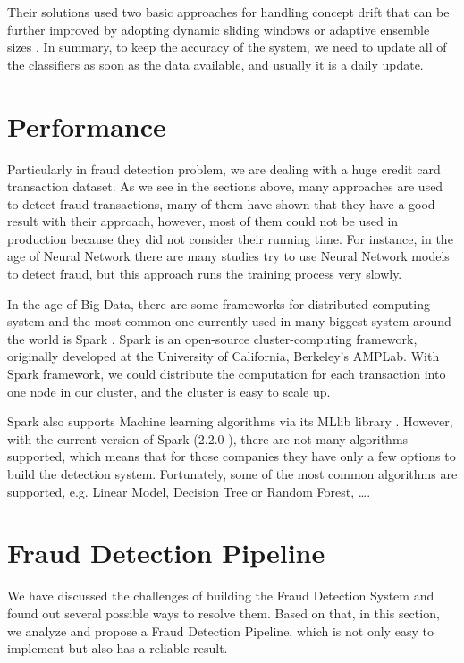 Their solutions used two basic approaches for handling concept drift that can be further improved by adopting dynamic sliding windows or adaptive ensemble sizes \citep{fan2004systematic}. In summary, to keep the accuracy of the system, we need to update all of the classifiers as soon as the data available, and usually it is a daily update.


\section{Performance}
\label{performance}

Particularly in fraud detection problem, we are dealing with a huge credit card transaction dataset. As we see in the sections above, many approaches are used to detect fraud transactions, many of them have shown that they have a good result with their approach, however, most of them could not be used in production because they did not consider their running time. For instance, in the age of Neural Network there are many studies try to use Neural Network models to detect fraud, but this approach runs the training process very slowly. 

In the age of Big Data, there are some frameworks for distributed computing system and the most common one currently used in many biggest system around the world is Spark \cite{zaharia2010spark}. Spark is an open-source cluster-computing framework, originally developed at the University of California, Berkeley's AMPLab. With Spark framework, we could distribute the computation for each transaction into one node in our cluster, and the cluster is easy to scale up.

Spark also supports Machine learning algorithms via its MLlib library \cite{meng2016mllib}. However, with the current version of Spark (2.2.0 \cite{spark220}), there are not many algorithms supported, which means that for those companies they have only a few options to build the detection system. Fortunately, some of the most common algorithms are supported, e.g. Linear Model, Decision Tree or Random Forest, \dots.


\section{Fraud Detection Pipeline}

We have discussed the challenges of building the Fraud Detection System and found out several possible ways to resolve them. Based on that, in this section, we analyze and propose a Fraud Detection Pipeline, which is not only easy to implement but also has a reliable result.


